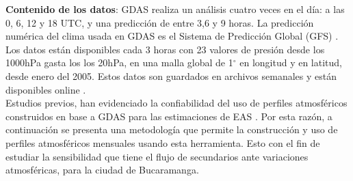\textbf{Contenido de los datos}: GDAS realiza un análisis cuatro veces en el día: a las 0, 6, 12 y 18 UTC, y una predicción de entre 3,6 y 9 horas. La predicción numérica del clima usada en GDAS es el Sistema de Predicción Global (GFS)  \citep{GFS}. Los datos están disponibles cada 3 horas con 23 valores de presión desde los 1000hPa gasta los los 20hPa, en una malla global de  1$^{\circ}$ en longitud y en latitud, desde enero del 2005. Estos datos son guardados en archivos semanales y están disponibles online  \citep{GDAS_data}. \\

Estudios previos, han evidenciado la confiabilidad del uso de perfiles atmosféricos construidos en base a GDAS para las estimaciones de EAS  \citep{GAP_2011}. Por esta razón, a continuación se presenta una metodología que permite la construcción y uso de perfiles atmosféricos mensuales usando esta herramienta. Esto con el fin de estudiar la sensibilidad que tiene el flujo de secundarios ante variaciones atmosféricas, para la ciudad de Bucaramanga.

